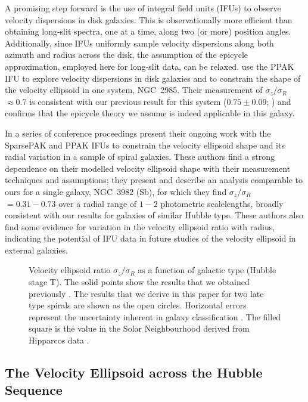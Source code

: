 \documentclass[useAMS,usenatbib]{mn2e}
\newcommand{\szsr}{$\sigma_z/\sigma_R$}
\begin{document}
A promising step forward is the use of integral field units (IFUs) to
observe velocity dispersions in disk galaxies.  This is observationally
more efficient than obtaining long-slit spectra, one at a time, along
two (or more) position angles.  Additionally, since IFUs uniformly
sample velocity dispersions along both azimuth and radius across the
disk, the assumption of the epicycle approximation, employed here for
long-slit data, can be relaxed.  \citet{Noordermeer2008} use the PPAK
IFU to explore velocity dispersions in disk galaxies and to constrain
the shape of the velocity ellipsoid in one system, NGC~2985.  Their
measurement of \szsr\ $\approx 0.7$ is consistent with our previous
result for this system ($0.75\pm0.09$; \citealt{Gerssen2000}) and
confirms that the epicycle theory we assume is indeed applicable in this
galaxy.

In a series of conference proceedings \citet{Westfall2008, Westfall2010}
present their ongoing work with the SparsePAK and PPAK IFUs to constrain
the velocity ellipsoid shape and its radial variation in a sample of
spiral galaxies.  These authors find a strong dependence on their
modelled velocity ellipsoid shape with their measurement techniques and
assumptions; they present and describe an analysis comparable to ours
for a single galaxy, NGC~3982 (Sb), for which they find
\szsr\ $=0.31-0.73$ over a radial range of $1-2$ photometric
scalelengths, broadly consistent with our results for galaxies of
similar Hubble type.  These authors also find some evidence for
variation in the velocity ellipsoid ratio with radius, indicating the
potential of IFU data in future studies of the velocity ellipsoid in
external galaxies.



\begin{figure}
   \centerline{}
   \caption{Velocity ellipsoid ratio $\sigma_z/\sigma_R$ as a function
     of galactic type (Hubble stage T).  The solid points show the
     results that we obtained previously \citep{Shapiro2003}. The
     results that we derive in this paper for two late type spirals are
     shown as the open circles.  Horizontal errors represent the
     uncertainty inherent in galaxy classification \citep{Naim1995}.
     The filled square is the value in the Solar Neighbourhood derived
     from Hipparcos data \citep{Dehnen1998}.
   \label{f:fig4}}
\end{figure}


\subsection{The Velocity Ellipsoid across the Hubble Sequence}
\label{sec:ellipticals}
\end{document}
